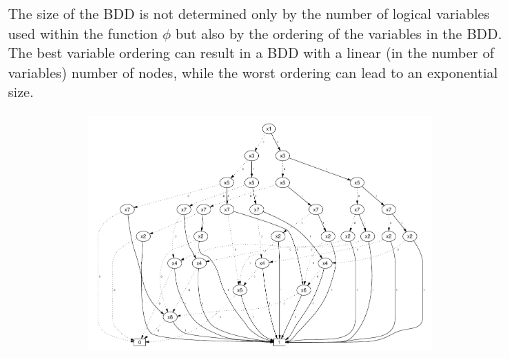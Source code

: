 \documentclass[pdflatex,sn-mathphys-num]{sn-jnl}%
\theoremstyle{thmstyleone}%
\theoremstyle{thmstyletwo}%
\theoremstyle{thmstylethree}%
\begin{document}
        The size of the BDD is not determined only by the number of logical variables used within the function $\phi$ but also by the ordering of the variables in the BDD. The best variable ordering can result in a BDD with a linear (in the number of variables) number of nodes, while the worst ordering can lead to an exponential size.

        \begin{figure}[H]
            \centering
            \begin{subfigure}{0.5\textwidth}
                \includegraphics[width=1.2\textwidth]{Figures/BDD_Variable_Ordering_Bad.pdf}
            \end{subfigure}
            \hspace*{2cm}
            \begin{subfigure}{0.3\textwidth}
                \hspace*{1cm}

\end{subfigure}
\end{figure}
\end{document}
